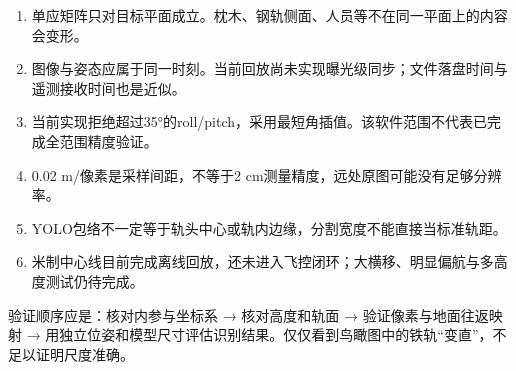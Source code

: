 \documentclass[UTF8,a4paper,11pt,fontset=windows]{ctexart}
\begin{document}
\begin{enumerate}
\item 单应矩阵只对目标平面成立。枕木、钢轨侧面、人员等不在同一平面上的内容会变形。
\item 图像与姿态应属于同一时刻。当前回放尚未实现曝光级同步；文件落盘时间与遥测接收时间也是近似。
\item 当前实现拒绝超过35°的roll/pitch，采用最短角插值。该软件范围不代表已完成全范围精度验证。
\item 0.02 m/像素是采样间距，不等于2 cm测量精度，远处原图可能没有足够分辨率。
\item YOLO包络不一定等于轨头中心或轨内边缘，分割宽度不能直接当标准轨距。
\item 米制中心线目前完成离线回放，还未进入飞控闭环；大横移、明显偏航与多高度测试仍待完成。
\end{enumerate}

验证顺序应是：核对内参与坐标系 → 核对高度和轨面 → 验证像素与地面往返映射 → 用独立位姿和模型尺寸评估识别结果。仅仅看到鸟瞰图中的铁轨“变直”，不足以证明尺度准确。
\end{document}
